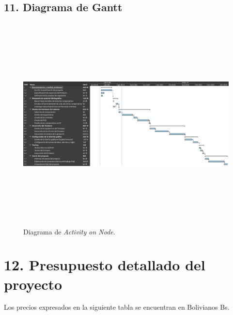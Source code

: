 \documentclass[
11pt, %
codirector, %
]{charter}
\begin{document}
\newpage
\begin{landscape}
\section{11. Diagrama de Gantt}
\label{sec:gantt}
\begin{figure}[htpb]
	\centering 
	\includegraphics[width=24cm, height=11cm]{./Figuras/d_ganntMSE3.png}
	\caption{Diagrama de \textit{Activity on Node}.}
	\label{fig:d_gantt}
\end{figure}
\end{landscape}

\section{12. Presupuesto detallado del proyecto}
\label{sec:presupuesto}
Los precios expresados en la siguiente tabla se encuentran en Bolivianos Bs.
\end{document}
